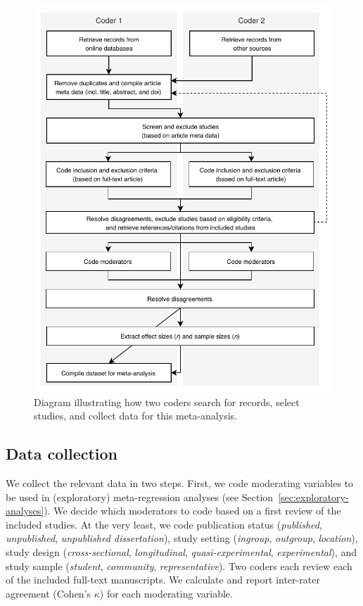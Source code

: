 \documentclass[10pt, a4paper]{article}
\begin{document}
\begin{figure}
\centering
\includegraphics[scale = 1]{coding-diagram}
\caption{Diagram illustrating how two coders search for records, select studies, and collect data for this meta-analysis.}
\label{fig:f1}
\end{figure}

\subsection{Data collection}
\label{sec:data-collection}

We collect the relevant data in two steps. First, we code moderating variables to be used in (exploratory) meta-regression analyses (see Section~\ref{sec:exploratory-analyses}). We decide which moderators to code based on a first review of the included studies. At the very least, we code publication status (\emph{published}, \emph{unpublished}, \emph{unpublished dissertation}), study setting (\emph{ingroup}, \emph{outgroup}, \emph{location}), study design (\emph{cross-sectional}, \emph{longitudinal}, \emph{quasi-experimental}, \emph{experimental}), and study sample (\emph{student}, \emph{community}, \emph{representative}). Two coders each review each of the included full-text manuscripts. We calculate and report inter-rater agreement (Cohen's $\kappa$) for each moderating variable.
\end{document}

